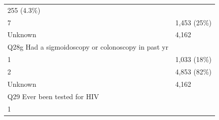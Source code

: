 \documentclass[]{article}
\begin{document}
\begin{longtable}[]{@{}ll@{}}
\begin{minipage}[t]{0.23\columnwidth}
255 (4.3\%)\strut
\end{minipage}\tabularnewline
\begin{minipage}[t]{0.71\columnwidth}\raggedright
7\strut
\end{minipage} & \begin{minipage}[t]{0.23\columnwidth}\raggedright
1,453 (25\%)\strut
\end{minipage}\tabularnewline
\begin{minipage}[t]{0.71\columnwidth}\raggedright
Unknown\strut
\end{minipage} & \begin{minipage}[t]{0.23\columnwidth}\raggedright
4,162\strut
\end{minipage}\tabularnewline
\begin{minipage}[t]{0.71\columnwidth}\raggedright
Q28g Had a sigmoidoscopy or colonoscopy in past yr\strut
\end{minipage} & \begin{minipage}[t]{0.23\columnwidth}\raggedright
\strut
\end{minipage}\tabularnewline
\begin{minipage}[t]{0.71\columnwidth}\raggedright
1\strut
\end{minipage} & \begin{minipage}[t]{0.23\columnwidth}\raggedright
1,033 (18\%)\strut
\end{minipage}\tabularnewline
\begin{minipage}[t]{0.71\columnwidth}\raggedright
2\strut
\end{minipage} & \begin{minipage}[t]{0.23\columnwidth}\raggedright
4,853 (82\%)\strut
\end{minipage}\tabularnewline
\begin{minipage}[t]{0.71\columnwidth}\raggedright
Unknown\strut
\end{minipage} & \begin{minipage}[t]{0.23\columnwidth}\raggedright
4,162\strut
\end{minipage}\tabularnewline
\begin{minipage}[t]{0.71\columnwidth}\raggedright
Q29 Ever been tested for HIV\strut
\end{minipage} & \begin{minipage}[t]{0.23\columnwidth}\raggedright
\strut
\end{minipage}\tabularnewline
\begin{minipage}[t]{0.71\columnwidth}\raggedright
1\strut
\end{minipage} & \begin{minipage}[t]{0.23\columnwidth}\raggedright

\end{minipage}
\end{longtable}
\end{document}
